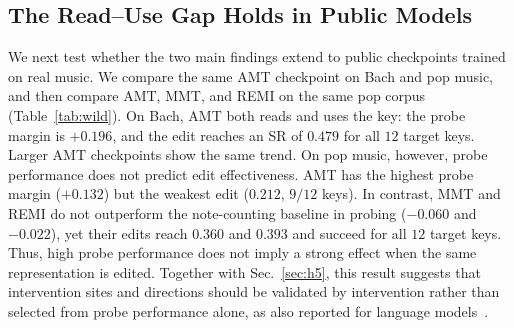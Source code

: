 \documentclass{article}
\begin{document}
\subsection{The Read--Use Gap Holds in Public Models}
\label{sec:wild}
We next test whether the two main findings extend to public checkpoints trained on real music.
We compare the same AMT checkpoint on Bach and pop music, and then compare AMT, MMT, and REMI on the same pop corpus (Table~\ref{tab:wild}).
On Bach, AMT both reads and uses the key: the probe margin is $+0.196$, and the edit reaches an SR of $0.479$ for all $12$ target keys.
Larger AMT checkpoints show the same trend.
On pop music, however, probe performance does not predict edit effectiveness.
AMT has the highest probe margin ($+0.132$) but the weakest edit ($0.212$, $9/12$ keys).
In contrast, MMT and REMI do not outperform the note-counting baseline in probing ($-0.060$ and $-0.022$), yet their edits reach $0.360$ and $0.393$ and succeed for all $12$ target keys.
Thus, high probe performance does not imply a strong effect when the same representation is edited.
Together with Sec.~\ref{sec:h5}, this result suggests that intervention sites and directions should be validated by intervention rather than selected from probe performance alone, as also reported for language models~\cite{wu2025axbench,arad2025selecting}.
\end{document}
